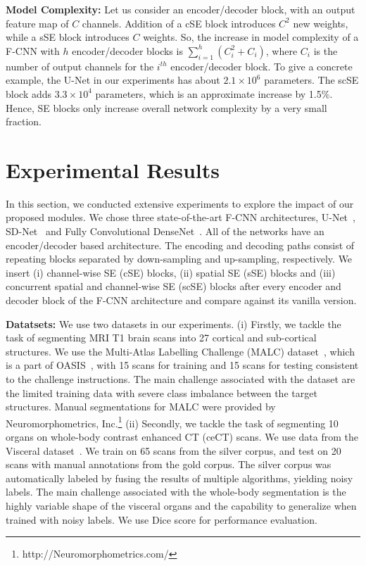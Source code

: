 \documentclass{llncs}
\begin{document}
\vspace{4mm}
\noindent
\textbf{Model Complexity:}
Let us consider an encoder/decoder block, with an output feature map of $C$ channels. Addition of a cSE block introduces $C^2$ new weights, while a sSE block introduces $C$ weights. So, the increase in model complexity of a F-CNN with $h$ encoder/decoder blocks is $\sum_{i=1}^h (C_i^2 + C_i)$, where $C_i$ is the number of output channels for the $i^{th}$ encoder/decoder block. To give a concrete example, the U-Net in our experiments has about $2.1 \times 10^6$ parameters. The scSE block adds $3.3 \times 10^4$ parameters, which is an approximate increase by 1.5\%. Hence, SE blocks only increase overall network complexity by a very small fraction.

\section{Experimental Results}
In this section, we conducted extensive experiments to explore the impact of our proposed modules. We chose three state-of-the-art F-CNN architectures, U-Net~\cite{Unet}, SD-Net~\cite{ecb2017} and Fully Convolutional DenseNet~\cite{densenet}. All of the networks have an encoder/decoder based architecture. The encoding and decoding paths consist of repeating blocks separated by down-sampling and up-sampling, respectively. We insert (i) channel-wise SE (cSE) blocks, (ii) spatial SE (sSE) blocks and (iii) concurrent spatial and channel-wise SE (scSE) blocks after every encoder and decoder block of the F-CNN architecture and compare against its vanilla version.

\noindent
\textbf{Datatsets: }
We use two datasets in our experiments.  (i) Firstly, we tackle the task of segmenting MRI T1 brain scans into 27 cortical and sub-cortical structures. We use the Multi-Atlas Labelling Challenge (MALC) dataset~\cite{malc}, which is a part of OASIS~\cite{oasis}, with 15 scans for training and 15 scans for testing consistent to the challenge instructions. The main challenge associated with the dataset are the limited training data with severe class imbalance between the target structures. Manual segmentations for MALC were provided by Neuromorphometrics, Inc.\footnote{http://Neuromorphometrics.com/} (ii) Secondly, we tackle the task of segmenting 10 organs on whole-body contrast enhanced CT (ceCT) scans. We use data from the Visceral dataset~\cite{visceral}. We train on 65 scans from the silver corpus, and test on 20 scans with manual annotations from the gold corpus. The silver corpus was automatically labeled by fusing the results of multiple algorithms, yielding noisy labels. The main challenge associated with the whole-body segmentation is the highly variable shape of the visceral organs and the capability to generalize when trained with noisy labels. We use Dice score for performance evaluation.
\end{document}
